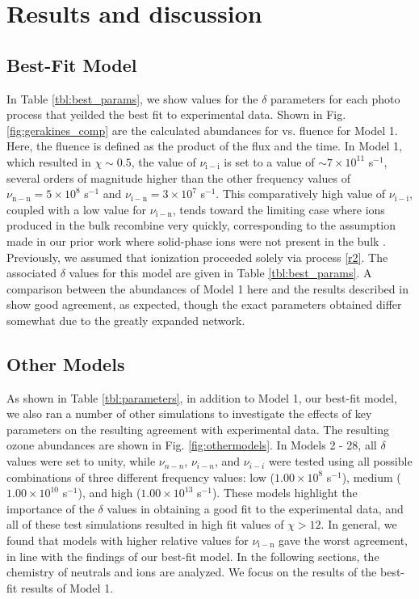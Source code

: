 \documentclass[journal=aesccq,manuscript=article,layout=twocolumn]{achemso}
\begin{document}
\section{Results and discussion} \label{sec:results}

\subsection{Best-Fit Model}

In Table \ref{tbl:best_params}, we show values for the $\delta$ parameters for each photo process that yeilded the best fit to experimental data. Shown in Fig. \ref{fig:gerakines_comp} are the calculated abundances for  vs. fluence for Model 1. Here, the fluence is defined as the product of the flux and the time. In Model 1, which resulted in $\chi\sim 0.5$, the value of $\nu_\mathrm{i-i}$ is set to a value of $\sim7\times10^{11}$ s$^{-1}$, several orders of magnitude higher than the other frequency values of $\nu_\mathrm{n-n}=5\times10^{8}$ s$^{-1}$ and $\nu_\mathrm{i-n}=3\times10^7$ s$^{-1}$. This comparatively high value of $\nu_\mathrm{i-i}$, coupled with a low value for $\nu_\mathrm{i-n}$, tends toward the limiting case where ions produced in the bulk recombine very quickly, corresponding to the assumption made in our prior work where solid-phase ions were not present in the bulk \citep{shingledecker_general_2018,shingledecker_efficient_2020,mullikin_new_2021}. Previously, we assumed that ionization proceeded solely via process \eqref{r2}. The associated $\delta$ values for this model are given in Table \ref{tbl:best_params}. A comparison between the abundances of Model 1 here and the results described in \citet{mullikin_new_2021} show good agreement, as expected, though the exact parameters obtained differ somewhat due to the greatly expanded network.


\subsection{Other Models}

As shown in Table \ref{tbl:parameters}, in addition to Model 1, our best-fit model, we also ran a number of other simulations to investigate the effects of key parameters on the resulting agreement with experimental data. The resulting ozone abundances are shown in Fig. \ref{fig:othermodels}. In Models 2 - 28, all $\delta$ values were set to unity, while $\nu_{n-n}$, $\nu_{i-n}$, and $\nu_{i-i}$ were tested using all possible combinations of three different frequency values: low ($1.00\times 10^{8}$ s$^{-1}$), medium ($1.00\times 10^{10}$ s$^{-1}$), and high ($1.00\times 10^{13}$ s$^{-1}$). These models highlight the importance of the $\delta$ values in obtaining a good fit to the experimental data, and all of these  test simulations resulted in high fit values of $\chi>12$. In general, we found that models with higher relative values for $\nu_\mathrm{i-n}$ gave the worst agreement, in line with the findings of our best-fit model. In the following sections, the chemistry of neutrals and ions are analyzed. We focus on the results of the best-fit results of Model 1.
\end{document}
